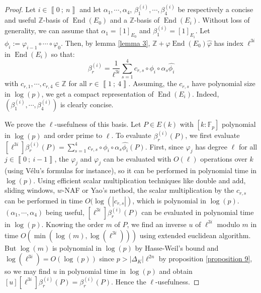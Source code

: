 \documentclass[a4paper,10pt]{report}
\theoremstyle{definition}
\theoremstyle{plain}
\theoremstyle{definition}
\newcommand{\Z}{\mathbb{Z}}
\newcommand{\F}{\mathbb{F}}
\renewcommand{\i}[2]{\left\llbracket #1~;~#2\right\rrbracket}
\renewcommand{\(}{\left(}
\renewcommand{\)}{\right)}
\DeclareMathOperator{\End}{End}
\begin{document}
\begin{proof}
Let $i\in\i{0}{n}$ and let $\alpha_1,\cdots,\alpha_4$, $\beta_1^{(i)},\cdots,\beta_4^{(i)}$ be respectively a concise and useful $\Z$-basis of $\End(E_0)$ and a $\Z$-basis of $\End(E_i)$. Without loss of generality, we can assume that $\alpha_1=[1]_{E_0}$ and $\beta_1^{(i)}=[1]_{E_i}$. Let $\phi_i:=\varphi_{i-1}\circ\cdots\circ\varphi_0$. Then, by lemma \ref{lemma 3}, $\Z+\varphi\End(E_0)\widehat{\varphi}$ has index $\ell^{3i}$ in $\End(E_i)$ so that:
\[\beta_r^{(i)}=\frac{1}{\ell^{3i}}\sum_{s=1}^4 c_{r,s}\circ \phi_i\circ \alpha_s\widehat{\phi_i}\]
with $c_{r,1},\cdots,c_{r,4}\in\Z$ for all $r\in\i{1}{4}$.  Assuming, the $c_{r,s}$ have polynomial size in $\log(p)$, we get a compact representation of $\End(E_i)$. Indeed,  $(\beta_1^{(i)},\cdots,\beta_4^{(i)})$ is clearly concise.  

We prove the $\ell$-usefulness of this basis. Let $P\in E(k)$ with $[k:\F_p]$ polynomial in $\log(p)$ and order prime to $\ell$.  To evaluate $\beta_r^{(i)}(P)$, we first evaluate $[\ell^{3i}]\beta_r^{(i)}(P)=\sum_{s=1}^4 c_{r,s}\circ \phi_i\circ \alpha_s\widehat{\phi_i}(P)$.  First, since $\varphi_j$ has degree $\ell$ for all $j\in\i{0}{i-1}$, the $\varphi_j$ and $\widehat{\varphi_j}$ can be evaluated with $O(\ell)$ operations over $k$ (using V\'{e}lu's formulas \cite{Velu} for instance), so it can be performed in polynomial time in $\log(p)$.  Using efficient scalar multiplication techniques like double and add,  sliding windows, $w$-NAF or Yao's method, the scalar multiplication by the $c_{r,s}$ can be performed in time $O(\log(|c_{r,s}|)$, which is polynomial in $\log(p)$. $(\alpha_1,\cdots,\alpha_4)$ being useful, $[\ell^{3i}]\beta_r^{(i)}(P)$ can be evaluated in polynomial time in $\log(p)$. Knowing the order $m$ of $P$, we find an inverse $u$ of $\ell^{3i}$ modulo $m$ in time $O(\min(\log(m),\log(\ell^{3i})))$ using extended euclidean algorithm. But $\log(m)$ is polynomial in $\log(p)$ by Hasse-Weil's bound and $\log(\ell^{3i})=O(\log(p))$ since $p>|\Delta_K|\ell^{2n}$ by proposition \ref{proposition 9}, so we may find $u$ in polynomial time in $\log(p)$ and obtain $[u][\ell^{3i}]\beta_r^{(i)}(P)=\beta_r^{(i)}(P)$.  Hence the $\ell$-usefulness.


\end{proof}
\end{document}
